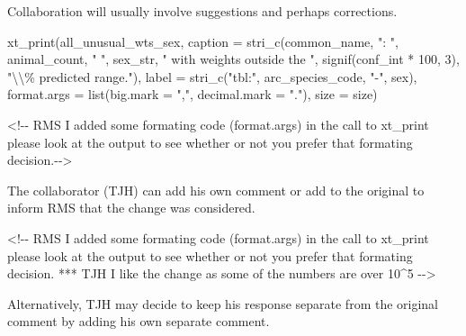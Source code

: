 \documentclass[
]{article}
\newenvironment{Shaded}{\begin{snugshade}}{\end{snugshade}}
\newcommand{\AttributeTok}[1]{\textcolor[rgb]{0.77,0.63,0.00}{#1}}
\newcommand{\DecValTok}[1]{\textcolor[rgb]{0.00,0.00,0.81}{#1}}
\newcommand{\FunctionTok}[1]{\textcolor[rgb]{0.00,0.00,0.00}{#1}}
\newcommand{\NormalTok}[1]{#1}
\newcommand{\SpecialCharTok}[1]{\textcolor[rgb]{0.00,0.00,0.00}{#1}}
\newcommand{\StringTok}[1]{\textcolor[rgb]{0.31,0.60,0.02}{#1}}
\begin{document}
Collaboration will usually involve suggestions and perhaps corrections.

\begin{Shaded}
\begin{Highlighting}[]
  \FunctionTok{xt\_print}\NormalTok{(all\_unusual\_wts\_sex,}
           \AttributeTok{caption =} \FunctionTok{stri\_c}\NormalTok{(common\_name, }\StringTok{":  "}\NormalTok{, animal\_count, }\StringTok{" "}\NormalTok{, sex\_str,}
                           \StringTok{" with weights outside the "}\NormalTok{,}
                           \FunctionTok{signif}\NormalTok{(conf\_int }\SpecialCharTok{*} \DecValTok{100}\NormalTok{, }\DecValTok{3}\NormalTok{),}
                           \StringTok{"}\SpecialCharTok{\textbackslash{}\textbackslash{}}\StringTok{\% predicted range."}\NormalTok{),}
           \AttributeTok{label =} \FunctionTok{stri\_c}\NormalTok{(}\StringTok{"tbl:"}\NormalTok{, arc\_species\_code, }\StringTok{"{-}"}\NormalTok{, sex),}
           \AttributeTok{format.args =} \FunctionTok{list}\NormalTok{(}\AttributeTok{big.mark =} \StringTok{","}\NormalTok{, }\AttributeTok{decimal.mark =} \StringTok{"."}\NormalTok{),}
           \AttributeTok{size =}\NormalTok{ size)}

\StringTok{\textasciigrave{}}\AttributeTok{\textless{}!{-}{-} RMS I added some formating code (format.args) in the call to xt\_print}
\AttributeTok{     please look at the output to see whether or not you prefer that formating}
\AttributeTok{     decision.{-}{-}\textgreater{}}\StringTok{\textasciigrave{}}
\end{Highlighting}
\end{Shaded}

The collaborator (TJH) can add his own comment or add to the original to
inform RMS that the change was considered.

\begin{Shaded}
\begin{Highlighting}[]
\StringTok{\textasciigrave{}}\AttributeTok{\textless{}!{-}{-} RMS I added some formating code (format.args) in the call to xt\_print}
\AttributeTok{     please look at the output to see whether or not you prefer that formating}
\AttributeTok{     decision.}
\AttributeTok{     *** TJH I like the change as some of the numbers are over 10\^{}5}
\AttributeTok{ {-}{-}\textgreater{}}\StringTok{\textasciigrave{}}
\end{Highlighting}
\end{Shaded}

Alternatively, TJH may decide to keep his response separate from the
original comment by adding his own separate comment.
\end{document}
